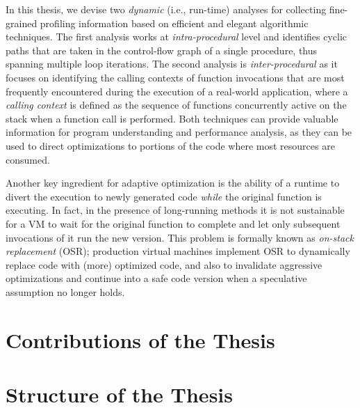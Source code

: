 In this thesis, we devise two {\em dynamic} (i.e., run-time) analyses for collecting fine-grained profiling information based on efficient and elegant algorithmic techniques. The first analysis works at {\em intra-procedural} level and identifies cyclic paths that are taken in the control-flow graph of a single procedure, thus spanning multiple loop iterations. The second analysis is {\em inter-procedural} as it focuses on identifying the calling contexts of function invocations that are most frequently encountered during the execution of a real-world application, where a {\em calling context} is defined as the sequence of functions concurrently active on the stack when a function call is performed. Both techniques can provide valuable information for program understanding and performance analysis, as they can be used to direct optimizations to portions of the code where most resources are consumed.

Another key ingredient for adaptive optimization is the ability of a runtime to divert the execution to newly generated code {\em while} the original function is executing. In fact, in the presence of long-running methods it is not sustainable for a VM to wait for the original function to complete and let only subsequent invocations of it run the new version. This problem is formally known as {\em on-stack replacement} (OSR); production virtual machines implement OSR to dynamically replace code with (more) optimized code, and also to invalidate aggressive optimizations and continue into a safe code version when a speculative assumption no longer holds.


\section{Contributions of the Thesis}

\section{Structure of the Thesis}